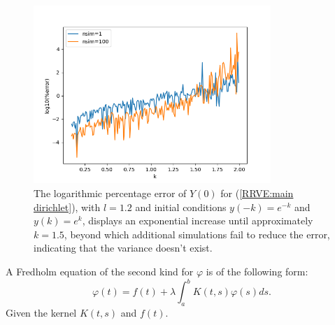 \documentclass[a4paper,12pt]{article}
\begin{document}
\begin{figure}[h!]
    \centering
    \includegraphics[width=0.8\textwidth]{plots/mainD explosion.png}
    \caption{The logarithmic percentage error of $Y(0)$ for
    (\ref{RRVE:main dirichlet}), with $l=1.2$ and initial conditions
    $y(-k)=e^{-k}$ and $y(k)=e^{k}$, displays an exponential
    increase until approximately $k=1.5$, beyond which additional
    simulations fail to reduce the error, indicating that the variance
    doesn't exist.}
    \label{fig:plots mainD explosion}
\end{figure}

\begin{definition}
    A Fredholm equation of the second kind for $\varphi$  is of the following form:
    $$
        \varphi(t)=f(t)+\lambda \int_a^b K(t, s) \varphi(s) ds.
    $$
    Given the kernel  $K(t, s)$  and  $ f(t)$.
\end{definition}



\end{document}

